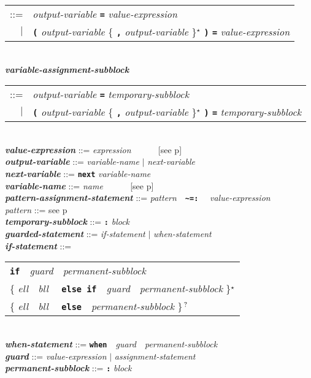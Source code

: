 \documentclass[12pt]{article}
\newcommand{\TT}[1]{{\tt \bfseries #1}}
\newcommand{\ttkey}[1]{{\tt \bfseries #1}}
\newcommand{\emkey}[1]{{\em \bfseries #1}}
\newcommand{\pagref}[1]{p\pageref{#1}}
\newcommand{\STAR}{{\Large $^\star$}}
\newcommand{\QMARK}{{$^{\,\mbox{\footnotesize ?}}$}}
\newcommand{\TILDE}{\textasciitilde}
\newenvironment{indpar}[1][0.3in]%
	{\begin{list}{}%
		     {\setlength{\itemsep}{0in}%
		      \setlength{\topsep}{0in}%
		      \setlength{\parsep}{1ex}%
		      \setlength{\labelwidth}{#1}%
		      \setlength{\leftmargin}{#1}%
		      \addtolength{\leftmargin}{\labelsep}}%
	 \item}%
	{\end{list}}
\begin{document}
\begin{indpar}
\hspace*{0.5in}
	\begin{tabular}[t]{rl}
	::= & {\em output-variable} \ttkey{=}
	      {\em value-expression} \\
	$|$ & \TT{(} {\em output-variable}
	             \{ \TT{,} {\em output-variable} \}\STAR{} \TT{)}
	      \ttkey{=} {\em value-expression} \\
	\end{tabular}
\\[1ex]
\emkey{variable-assignment-subblock} \\
\hspace*{0.5in}
	\begin{tabular}[t]{rl}
	::= & {\em output-variable} \ttkey{=}
	      {\em temporary-subblock} \\
	$|$ & \TT{(} {\em output-variable}
	             \{ \TT{,} {\em output-variable} \}\STAR{} \TT{)}
	      \ttkey{=} {\em temporary-subblock} \\
	\end{tabular}
\\[1ex]
\emkey{value-expression} ::= {\em expression} ~~~~~ [see \pagref{EXPRESSION}]
\\[1ex]
\emkey{output-variable} ::= {\em variable-name} $|$ {\em next-variable}
\\[1ex]
\emkey{next-variable} ::= \ttkey{next} {\em variable-name}
\\[1ex]
\emkey{variable-name} ::= {\em name} ~~~~~ [see \pagref{NAME}]
\\[1ex]
\emkey{pattern-assignment-statement} ::=
	{\em pattern}~~\TT{\TILDE=:}\index{~=:@{\TT{\TILDE=:}}}~~%
	{\em value-expression}
\\[1ex]
{\em pattern} ::= see \pagref{PATTERN} \\[1ex]
\emkey{temporary-subblock} ::= \TT{:} {\em block}
\\[1ex]
\emkey{guarded-statement} ::=
      {\em if-statement} $|$ {\em when-statement}
\\[1ex]
\emkey{if-statement} ::=
      \begin{tabular}[t]{l}
      \ttkey{if}~~{\em guard}~~{\em permanent-subblock} \\
      \{ {\em ell}~~{\em bll}~~%
         \ttkey{else if}~~{\em guard}~~{\em permanent-subblock} \}\STAR{} \\
      \{ {\em ell}~~{\em bll}~~%
         \ttkey{else}~~{\em permanent-subblock} \}\QMARK{} \\
      \end{tabular} \\[1ex]
\emkey{when-statement} ::=
      \ttkey{when}~~{\em guard}~~{\em permanent-subblock} \\[1ex]
\emkey{guard} ::= {\em value-expression} $|$ {\em assignment-statement}
\\[1ex]
\emkey{permanent-subblock} ::= \TT{:} {\em block}
\end{indpar}
\end{document}
